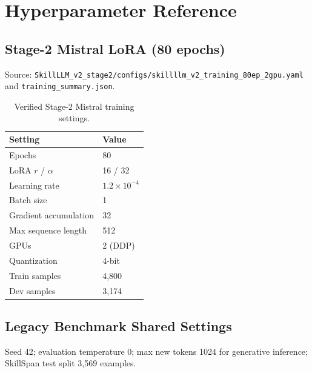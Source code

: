 \chapter{Hyperparameter Reference}
\label{app:hyperparams}

\section{Stage-2 Mistral LoRA (80 epochs)}

Source: \texttt{SkillLLM\_v2\_stage2/configs/skillllm\_v2\_training\_80ep\_2gpu.yaml} and \texttt{training\_summary.json}.

\begin{table}[htbp]
  \centering
  \caption{Verified Stage-2 Mistral training settings.}
  \begin{tabular}{ll}
    \toprule
    Setting & Value \\
    \midrule
    Epochs & 80 \\
    LoRA $r$ / $\alpha$ & 16 / 32 \\
    Learning rate & $1.2 \times 10^{-4}$ \\
    Batch size & 1 \\
    Gradient accumulation & 32 \\
    Max sequence length & 512 \\
    GPUs & 2 (DDP) \\
    Quantization & 4-bit \\
    Train samples & 4{,}800 \\
    Dev samples & 3{,}174 \\
    \bottomrule
  \end{tabular}
\end{table}

\section{Legacy Benchmark Shared Settings}

Seed 42; evaluation temperature 0; max new tokens 1024 for generative inference; SkillSpan test split 3{,}569 examples.
